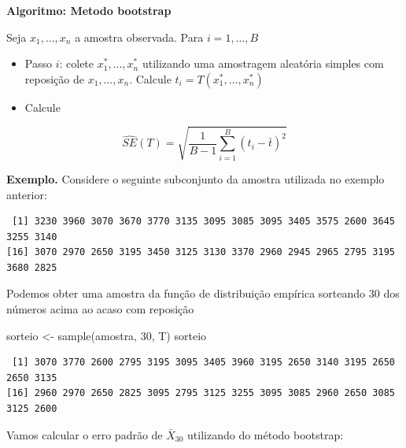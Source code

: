 \documentclass[
  letterpaper,
  DIV=11,
  numbers=noendperiod]{scrartcl}
\newenvironment{Shaded}{\begin{snugshade}}{\end{snugshade}}
\newcommand{\DecValTok}[1]{\textcolor[rgb]{0.68,0.00,0.00}{#1}}
\newcommand{\FunctionTok}[1]{\textcolor[rgb]{0.28,0.35,0.67}{#1}}
\newcommand{\NormalTok}[1]{\textcolor[rgb]{0.00,0.23,0.31}{#1}}
\newcommand{\OtherTok}[1]{\textcolor[rgb]{0.00,0.23,0.31}{#1}}
\newcommand{\SpecialCharTok}[1]{\textcolor[rgb]{0.37,0.37,0.37}{#1}}
\begin{document}
\textbf{Algoritmo: Metodo bootstrap}

Seja \(x_1,\ldots,x_n\) a amostra observada. Para \(i=1,\ldots,B\)

\begin{itemize}
\item
  Passo \(i\): colete \(x_1^*,\ldots,x_n^*\) utilizando uma amostragem
  aleatória simples com reposição de \(x_1,\ldots,x_n\). Calcule
  \(t_i=T(x_1^*,\ldots,x_n^*)\)
\item
  Calcule
\end{itemize}

\[\widehat{SE}(T)=\sqrt{\frac{1}{B-1}\sum_{i=1}^B(t_i-\bar{t})^2}\]

\textbf{Exemplo.} Considere o seguinte subconjunto da amostra utilizada
no exemplo anterior:

\begin{Shaded}
\end{Shaded}

\begin{verbatim}
 [1] 3230 3960 3070 3670 3770 3135 3095 3085 3095 3405 3575 2600 3645 3255 3140
[16] 3070 2970 2650 3195 3450 3125 3130 3370 2960 2945 2965 2795 3195 3680 2825
\end{verbatim}

Podemos obter uma amostra da função de distribuição empírica sorteando
30 dos números acima ao acaso com reposição

\begin{Shaded}
\begin{Highlighting}[]
\NormalTok{sorteio }\OtherTok{\textless{}{-}} \FunctionTok{sample}\NormalTok{(amostra, }\DecValTok{30}\NormalTok{, T)}
\NormalTok{sorteio}
\end{Highlighting}
\end{Shaded}

\begin{verbatim}
 [1] 3070 3770 2600 2795 3195 3095 3405 3960 3195 2650 3140 3195 2650 2650 3135
[16] 2960 2970 2650 2825 3095 2795 3125 3255 3095 3085 2960 2650 3085 3125 2600
\end{verbatim}

Vamos calcular o erro padrão de \(\bar{X}_{30}\) utilizando do método
bootstrap:
\end{document}
